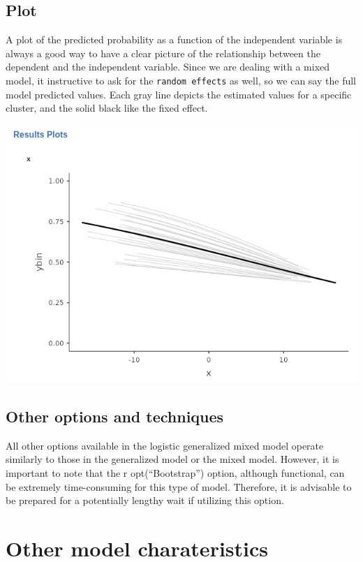 \documentclass[
]{book}
\begin{document}
\hypertarget{plot-2}{%
\subsection{Plot}\label{plot-2}}

A plot of the predicted probability as a function of the independent variable is always a good way to have a clear picture of the relationship between the dependent and the independent variable. Since we are dealing with a mixed model, it instructive to ask for the \texttt{random\ effects} as well, so we can say the full model predicted values. Each gray line depicts the estimated values for a specific cluster, and the solid black like the fixed effect.

\includegraphics[width=0.8\linewidth]{bookletpics/5_logistic_plot1}

\hypertarget{other-options-and-techniques}{%
\subsection{Other options and techniques}\label{other-options-and-techniques}}

All other options available in the logistic generalized mixed model operate similarly to those in the generalized model or the mixed model. However, it is important to note that the r opt(``Bootstrap'') option, although functional, can be extremely time-consuming for this type of model. Therefore, it is advisable to be prepared for a potentially lengthy wait if utilizing this option.

\hypertarget{other-model-charateristics}{%
\section{Other model charateristics}\label{other-model-charateristics}}
\end{document}
